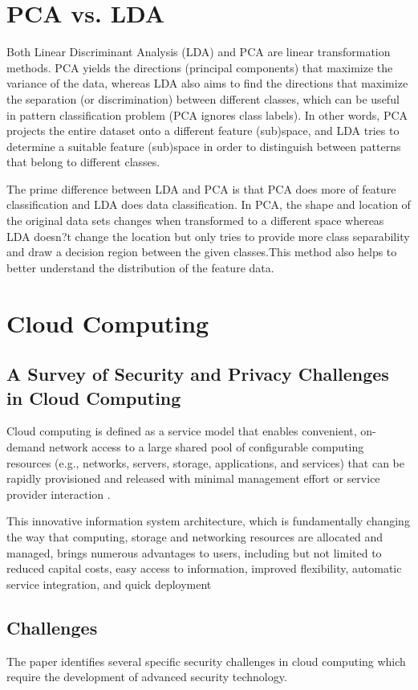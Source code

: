 \documentclass[a4paper]{article}
\begin{document}
\section{PCA vs. LDA}
Both Linear Discriminant Analysis (LDA) and PCA are linear transformation methods. PCA yields the directions (principal components) that maximize the variance of the data, whereas LDA also aims to find the directions that maximize the separation (or discrimination) between different classes, which can be useful in pattern classification problem (PCA ignores class labels). 
In other words, PCA projects the entire dataset onto a different feature (sub)space, and LDA tries to determine a suitable feature (sub)space in order to distinguish between patterns that belong to different classes.

The prime difference between LDA and
PCA is that PCA does more of feature classification and LDA does data classification. In PCA, the
shape and location of the original data sets changes when transformed to a different space whereas
LDA doesn?t change the location but only tries to provide more class separability and draw a
decision region between the given classes.This method also helps to better understand the
distribution of the feature data. 



\section{Cloud Computing}
\subsection{A Survey of Security and Privacy Challenges in Cloud Computing}
Cloud computing is defined as a service model that
enables convenient, on-demand network access to a large
shared pool of configurable computing resources (e.g.,
networks, servers, storage, applications, and services)
that can be rapidly provisioned and released with minimal
management effort or service provider interaction \cite{nistcc}.

This innovative information system architecture, which is
fundamentally changing the way that computing, storage
and networking resources are allocated and managed,
brings numerous advantages to users, including but not
limited to reduced capital costs, easy access to information,
improved flexibility, automatic service integration, and quick deployment \cite{ccreally}

\subsection{Challenges}
The paper identifies several specific security challenges in cloud computing which require the development of advanced security technology.
\end{document}
